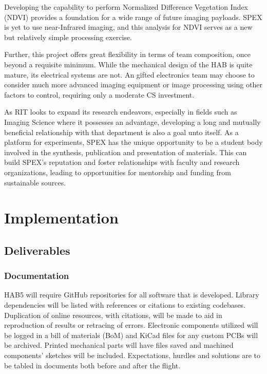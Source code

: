\documentclass[conference]{IEEEtran} %
\begin{document}
Developing the capability to perform Normalized Difference Vegetation Index (NDVI) provides a foundation for a wide range of future imaging payloads.
SPEX is yet to use near-Infrared imaging, and this analysis for NDVI serves as a new but relatively simple processing exercise.

Further, this project offers great flexibility in terms of team composition, once beyond a requisite minimum.
While the mechanical design of the HAB is quite mature, its electrical systems are not.
An gifted electronics team may choose to consider much more advanced imaging equipment or image processing using other factors to control, requiring only a moderate CS investment.

As RIT looks to expand its research endeavors, especially in fields such as Imaging Science where it possesses an advantage, developing a long and mutually beneficial relationship with that department is also a goal unto itself.
As a platform for experiments, SPEX has the unique opportunity to be a student body involved in the synthesis, publication and presentation of materials.
This can build SPEX's reputation and foster relationships with faculty and research organizations, leading to opportunities for mentorship and funding from sustainable sources.

\section{Implementation}
\label{implementation}
\subsection{Deliverables}
\label{deliverables}
\subsubsection{Documentation}
\label{deliverables-documentation}
 HAB5 will require GitHub repositories for all software that is developed. Library dependencies will be listed with references or citations to existing codebases. Duplication of online resources, with citations, will be made to aid in reproduction of results or retracing of errors.
 Electronic components utilized will be logged in a bill of materials (BoM) and KiCad files for any custom PCBs will be archived.
 Printed mechanical parts will have files saved and machined components' sketches will be included.
 Expectations, hurdles and solutions are to be tabled in documents both before and after the flight.
\end{document}
